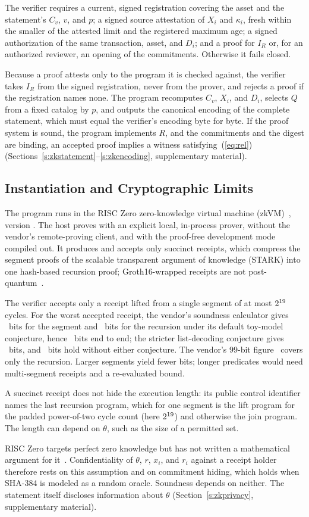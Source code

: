 The verifier requires a current, signed registration covering the asset and the statement's $C_v$, $v$, and $p$; a signed source attestation of $X_i$ and $\kappa_i$, fresh within the smaller of the attested limit and the registered maximum age; a signed authorization of the same transaction, asset, and $D_i$; and a proof for $I_R$ or, for an authorized reviewer, an opening of the commitments. Otherwise it fails closed.

Because a proof attests only to the program it is checked against, the verifier takes $I_R$ from the signed registration, never from the prover, and rejects a proof if the registration names none. The program recomputes $C_v$, $X_i$, and $D_i$, selects $Q$ from a fixed catalog by $p$, and outputs the canonical encoding of the complete statement, which must equal the verifier's encoding byte for byte. If the proof system is sound, the program implements $R$, and the commitments and the digest are binding, an accepted proof implies a witness satisfying~(\ref{eq:rel}) (Sections~\ref{s:zkstatement}--\ref{s:zkencoding}, supplementary material).

\subsection{Instantiation and Cryptographic Limits}
\label{sec:zklimits}
The program runs in the RISC Zero zero-knowledge virtual machine (zkVM)~\cite{risc0}, version \ZkVersion. The host proves with an explicit local, in-process prover, without the vendor's remote-proving client, and with the proof-free development mode compiled out. It produces and accepts only succinct receipts, which compress the segment proofs of the scalable transparent argument of knowledge (STARK) into one hash-based recursion proof; Groth16-wrapped receipts are not post-quantum~\cite{risc0sec}.

The verifier accepts only a receipt lifted from a single segment of at most $2^{19}$ cycles. For the worst accepted receipt, the vendor's soundness calculator gives \ZkSegBits~bits for the segment and \ZkRecBits~bits for the recursion under its default toy-model conjecture, hence \ZkEndBits~bits end to end; the stricter list-decoding conjecture gives \ZkStrictBits~bits, and \ZkProvenBits~bits hold without either conjecture. The vendor's 99-bit figure~\cite{risc0sec} covers only the recursion. Larger segments yield fewer bits; longer predicates would need multi-segment receipts and a re-evaluated bound.

A succinct receipt does not hide the execution length: its public control identifier names the last recursion program, which for one segment is the lift program for the padded power-of-two cycle count (here $2^{19}$) and otherwise the join program. The length can depend on $\theta$, such as the size of a permitted set.

RISC Zero targets perfect zero knowledge but has not written a mathematical argument for it~\cite{risc0sec}. Confidentiality of $\theta$, $r$, $x_i$, and $r_i$ against a receipt holder therefore rests on this assumption and on commitment hiding, which holds when SHA-384 is modeled as a random oracle. Soundness depends on neither. The statement itself discloses information about $\theta$ (Section~\ref{s:zkprivacy}, supplementary material).
